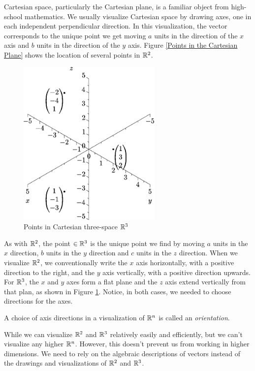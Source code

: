 \documentclass[fleqn]{report}
\begin{document}
Cartesian space, particularly the Cartesian plane, is a familiar
object from high-school mathematics. We usually visualize
Cartesian space by drawing axes, one in each
independent perpendicular direction. 
In this visualization, the vector
 corresponds to the
unique point we get moving $a$ units in the direction of the $x$
axis and $b$ units in the direction of the $y$ axis.
Figure \ref{Points in the Cartesian Plane} shows the location
of several points in $\mathbb{R}^2$.

\begin{figure}[t]
\centering
\includegraphics[width=7cm]{figure2.eps}
\caption{Points in Cartesian three-space $\mathbb{R}^3$}
\label{Points in Cartesian three-space}
\end{figure}

As with $\mathbb{R}^2$, the point
 $\in \mathbb{R}^3$ is the
unique point we find by moving $a$ units in the $x$ direction,
$b$ units in the $y$ direction and $c$ units in the $z$
direction. When we visualize $\mathbb{R}^2$, we conventionally write
the $x$ axis horizontally, with a positive direction to the
right, and the $y$ axis vertically, with a positive direction
upwards. For $\mathbb{R}^3$, the $x$ and $y$ axes form a flat plane
and the $z$ axis extend vertically from that plan, as shown in
Figure \ref{Points in Cartesian three-space}. Notice, in both
cases, we needed to choose directions for the axes.

\begin{defn}
A choice of axis directions in a visualization of $\mathbb{R}^n$ 
is called an \emph{orientation}.
\end{defn}

While we can visualize $\mathbb{R}^2$ and $\mathbb{R}^3$ relatively easily and
efficiently, but we can't visualize any higher $\mathbb{R}^n$. However,
this doesn't prevent us from working in higher dimensions. We need to
rely on the algebraic descriptions of vectors instead of the
drawings and visualizations of $\mathbb{R}^2$ and $\mathbb{R}^3$. 
\end{document}
